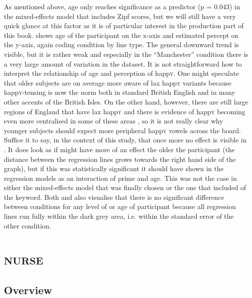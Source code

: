 As mentioned above, age only reaches significance as a predictor (p = 0.043) in the mixed-effects model that includes Zipf scores, but we will still have a very quick glance at this factor as it is of particular interest in the production part of this book.
 shows age of the participant on the x-axis and estimated percept on the y-axis, again coding  condition by line type.
The general downward trend is visible, but it is rather weak and especially in the ``Manchester'' condition there is a very large amount of variation in the dataset.
It is not straightforward how to interpret the relationship of age and perception of happ\textsc{y}.
One might speculate that older subjects are on average more aware of lax happ\textsc{y} variants because happ\textsc{y}-tensing is now the norm both in standard British English and in many other accents of the British Isles.
On the other hand, however, there are still large regions of England that have lax happ\textsc{y} and there is evidence of happ\textsc{y} becoming even more centralised in some of these areas \parencite[cf.][]{flynn2010}, so it is not really clear why younger subjects should expect more peripheral happ\textsc{y} vowels across the board.
Suffice it to say, in the context of this study, that once more no  effect is visible in .
It does look as if  might have more of an effect the older the participant (the distance between the regression lines grows towards the right hand side of the graph), but if this was statistically significant it should have shown in the regression models as an interaction of prime and age.
This was not the case in either the mixed-effects model that was finally chosen or the one that included  of the keyword.
Both  and  also visualise that there is no significant difference between  conditions for any level of  or age of participant because all regression lines run fully within the dark grey area, i.e. within the standard error of the other condition.

\section{\textsc{nurse}}
\label{sec.perc_res.nurse}	
	\subsection{Overview}
	\label{sec.perc_res.nurse.overview}

